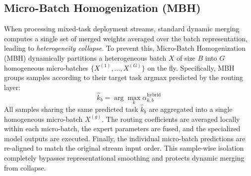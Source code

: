 \subsection{Micro-Batch Homogenization (MBH)}
When processing mixed-task deployment streams, standard dynamic merging computes a single set of merged weights averaged over the batch representation, leading to \emph{heterogeneity collapse}. To prevent this, Micro-Batch Homogenization (MBH) dynamically partitions a heterogeneous batch $X$ of size $B$ into $G$ homogeneous micro-batches $\{X^{(1)}, \dots, X^{(G)}\}$ on the fly. 
Specifically, MBH groups samples according to their target task argmax predicted by the routing layer:
\begin{equation}
\hat{k}_b = \arg\max_{k} \alpha^{\text{hybrid}}_{k, b}
\end{equation}
All samples sharing the same predicted task $\hat{k}_b$ are aggregated into a single homogeneous micro-batch $X^{(g)}$. The routing coefficients are averaged locally within each micro-batch, the expert parameters are fused, and the specialized model outputs are executed. Finally, the individual micro-batch predictions are re-aligned to match the original stream input order. This sample-wise isolation completely bypasses representational smoothing and protects dynamic merging from collapse.
